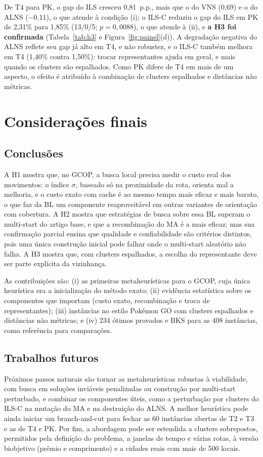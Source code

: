 De T4 para PK, o gap do ILS cresceu 0,81~p.p., mais que o do VNS (0,69) e o do ALNS ($-$0,11), o que atende à condição (i); o ILS-C reduziu o gap do ILS em PK de 2,31\% para 1,85\% (13/0/5; $p=0{,}0088$), o que atende à (ii), e \textbf{a H3 foi confirmada} (Tabela~\ref{tab:h3} e Figura~\ref{fig:painel}(d)). A degradação negativa do ALNS reflete seu gap já alto em T4, e não robustez, e o ILS-C também melhora em T4 (1,40\% contra 1,50\%): trocar representantes ajuda em geral, e mais quando os clusters são espalhados. Como PK difere de T4 em mais de um aspecto, o efeito é atribuído à combinação de clusters espalhados e distâncias não métricas.

\section{Considerações finais}

\subsection{Conclusões}

A H1 mostra que, no GCOP, a busca local precisa medir o custo real dos movimentos: o índice $\sigma$, baseado só na proximidade da rota, orienta mal a melhoria, e o custo exato com cache é ao mesmo tempo mais eficaz e mais barato, o que faz da BL um componente reaproveitável em outras variantes de orientação com cobertura. A H2 mostra que estratégias de busca sobre essa BL superam o multi-start do artigo base, e que a recombinação do MA é a mais eficaz; mas sua confirmação parcial ensina que qualidade e confiabilidade são critérios distintos, pois uma única construção inicial pode falhar onde o multi-start aleatório não falha. A H3 mostra que, com clusters espalhados, a escolha do representante deve ser parte explícita da vizinhança.

As contribuições são: (i) as primeiras metaheurísticas para o GCOP, cuja única heurística era a inicialização do método exato; (ii) evidência estatística sobre os componentes que importam (custo exato, recombinação e troca de representantes); (iii) instâncias no estilo Pokémon GO com clusters espalhados e distâncias não métricas; e (iv) 234 ótimos provados e BKS para as 408 instâncias, como referência para comparações.

\subsection{Trabalhos futuros}

Próximos passos naturais são tornar as metaheurísticas robustas à viabilidade, com busca em soluções inviáveis penalizadas ou construção por multi-start perturbado, e combinar os componentes úteis, como a perturbação por clusters do ILS-C na mutação do MA e na destruição do ALNS. A melhor heurística pode ainda iniciar um branch-and-cut para fechar as 60 instâncias abertas de T2 e T3 e as de T4 e PK. Por fim, a abordagem pode ser estendida a clusters sobrepostos, permitidos pela definição do problema, a janelas de tempo e várias rotas, à versão biobjetivo (prêmio e comprimento) e a cidades reais com mais de 500 locais.
